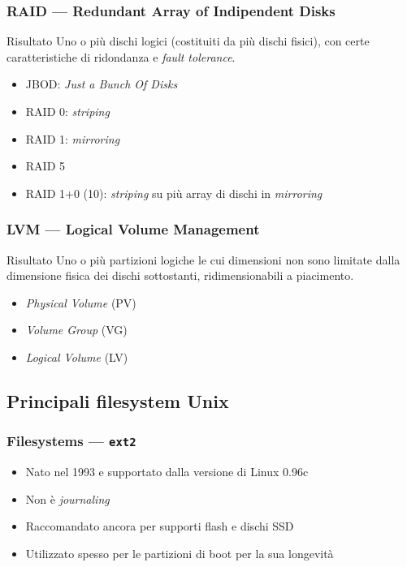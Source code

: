 \documentclass{beamer}
\begin{document}
\begin{frame}[t]
  \frametitle{RAID --- Redundant Array of Indipendent Disks}

  \begin{block}{Risultato}
    Uno o più dischi logici (costituiti da più dischi fisici), con certe
    caratteristiche di ridondanza e \textit{fault tolerance}.
  \end{block}

    \begin{itemize}[<+->]
      \item JBOD: \textit{Just a Bunch Of Disks}
      \item RAID 0: \textit{striping}
      \item RAID 1: \textit{mirroring}
      \item RAID 5
      \item RAID 1+0 (10): \textit{striping} su più array di dischi in
	\textit{mirroring}
    \end{itemize}

\end{frame}

\begin{frame}[t]
  \frametitle{LVM --- Logical Volume Management}

  \begin{block}{Risultato}
    Uno o più partizioni logiche le cui dimensioni non sono limitate dalla
    dimensione fisica dei dischi sottostanti, ridimensionabili a piacimento.
  \end{block}

    \begin{itemize}[<+->]
      \item \textit{Physical Volume} (PV)
      \item \textit{Volume Group} (VG)
      \item \textit{Logical Volume} (LV)
    \end{itemize}
\end{frame}

\subsection{Principali filesystem Unix}

\begin{frame}
  \frametitle{Filesystems --- \texttt{ext2}}

  \begin{itemize}[<+->]
    \item Nato nel 1993 e supportato dalla versione di Linux 0.96c
    \item Non è \textit{journaling}
    \item Raccomandato ancora per supporti flash e dischi SSD
    \item Utilizzato spesso per le partizioni di boot per la sua longevità
  \end{itemize}

\end{frame}
\end{document}
